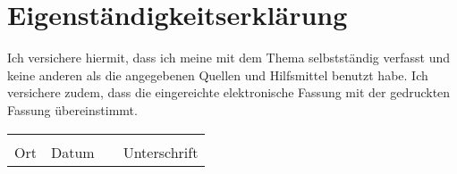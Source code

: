\thispagestyle{empty}

\section*{Eigenständigkeitserklärung}
\vspace*{2em}

Ich versichere hiermit, dass ich meine {\vartype} mit dem Thema {\itshape \vartitle} selbstständig verfasst und keine anderen als die angegebenen Quellen und Hilfsmittel benutzt habe.
Ich versichere zudem, dass die eingereichte elektronische Fassung mit der gedruckten Fassung übereinstimmt.

\vspace{3em}

\begin{tabular}{ p{3cm}p{3cm}p{1cm}p{5cm} }
        \hrulefill & \hrulefill & & \hrulefill\\
        Ort & Datum & & Unterschrift\\
\end{tabular}
